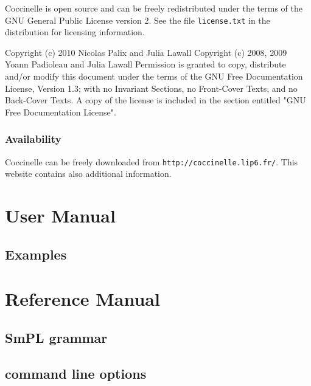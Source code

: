 \documentclass{report}
\begin{document}
Coccinelle is open source and can be freely redistributed under the
terms of the GNU General Public License version 2. See the file
\verb+license.txt+ in the distribution for licensing information.

Copyright (c)  2010  Nicolas Palix and Julia Lawall
Copyright (c)  2008, 2009 Yoann Padioleau and Julia Lawall
    Permission is granted to copy, distribute and/or modify this document
    under the terms of the GNU Free Documentation License, Version 1.3;
    with no Invariant Sections, no Front-Cover Texts, and no Back-Cover Texts.
    A copy of the license is included in the section entitled "GNU
    Free Documentation License".

\section*{Availability}

Coccinelle can be freely downloaded
from \verb+http://coccinelle.lip6.fr/+.
This website contains also additional information.


\part{User Manual}
\label{part:usermanual}







\chapter{Examples}
















\part{Reference Manual}
\label{part:refmanual}

\chapter{SmPL grammar}



\chapter{\spatch command line options}
\end{document}
